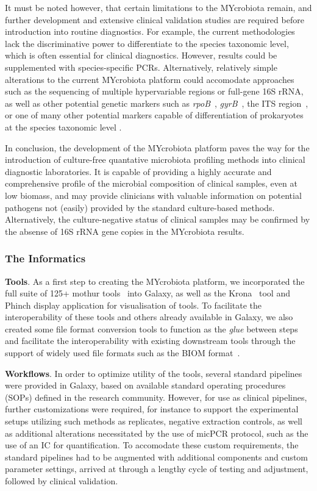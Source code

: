 It must be noted however, that certain limitations to the MYcrobiota remain, and further development and extensive clinical validation studies are required before introduction into routine diagnostics. For example, the current methodologies lack the discriminative power to differentiate to the species taxonomic level, which is often essential for clinical diagnostics. However, results could be supplemented with species-specific PCRs. Alternatively, relatively simple alterations to the current MYcrobiota platform could accomodate approaches such as the sequencing of multiple hypervariable regions or full-gene 16S rRNA, as well as other potential genetic markers such as \emph{rpoB}~\cite{adekambi2009rpob}, \emph{gyrB}~\cite{yanamoto1995pcr}, the ITS region~\cite{schoch20012nuclear}, or one of many other potential markers capable of differentiation of prokaryotes at the species taxonomic level \cite{lab2016marker,sabat2017targeted}.

In conclusion, the development of the MYcrobiota platform paves the way for the introduction of culture-free quantative microbiota profiling methods into clinical diagnostic laboratories. It is capable of providing a highly accurate and comprehensive profile of the microbial composition of clinical samples, even at low biomass, and may provide clinicians with valuable information on potential pathogens not (easily) provided by the standard culture-based methods. Alternatively, the culture-negative status of clinical samples may be confirmed by the absense of 16S rRNA gene copies in the MYcrobiota results.

\subsubsection{The Informatics}

\textbf{Tools}. As a first step to creating the MYcrobiota platform, we incorporated the full suite of 125+ mothur tools~\cite{TODO} into Galaxy, as well as the Krona~\cite{TODO} tool and Phinch display application for visualisation of tools. To facilitate the interoperability of these tools and others already available in Galaxy, we also created some file format conversion tools to function as the \emph{glue} between steps and facilitate the interoperability with existing downstream tools through the support of widely used file formats such as the BIOM format~\cite{TODO}.


\textbf{Workflows}. In order to optimize utility of the tools, several standard pipelines were provided in Galaxy, based on available standard operating procedures (SOPs) defined in the research community. However, for use as clinical pipelines, further customizations were required, for instance to support the experimental setups utilizing such methods as replicates, negative extraction controls, as well as additional alterations necessitated by the use of micPCR protocol, such as the use of an IC for quantification. To accomodate these custom requirements, the standard pipelines had to be augmented with additional components and custom parameter settings, arrived at through a lengthy cycle of testing and adjustment, followed by clinical validation.


